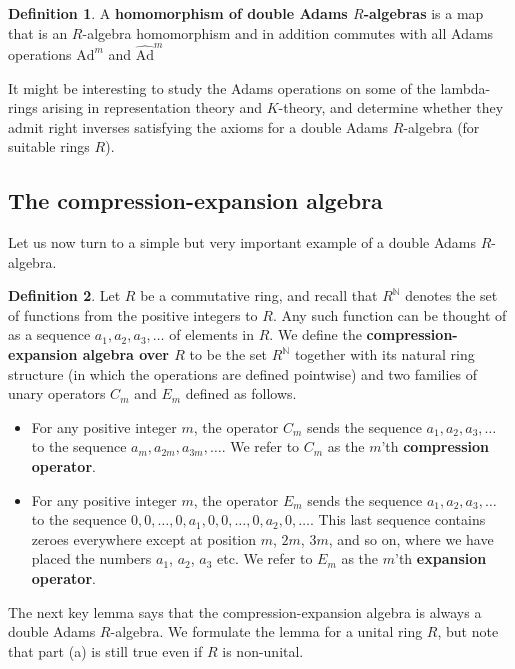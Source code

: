 \documentclass[a4paper]{article}
\theoremstyle{definition}
\newtheorem{definition}{Definition}[section]
\theoremstyle{remark}
\newcommand{\ad}[1]{\text{Ad}^{#1}}
\newcommand{\hatad}[1]{\widehat{\text{Ad}}^{#1}}
\newcommand{\N}{\mathbb{N}}
\newcommand{\defhl}[1]{\textbf{#1}}
\begin{document}
\begin{definition}
A \defhl{homomorphism of double Adams $R$-algebras} is a map that is an $R$-algebra homomorphism and in addition commutes with all Adams operations $\ad{m}$ and $\hatad{m}$
\end{definition}


It might be interesting to study the Adams operations on some of the lambda-rings arising in representation theory and $K$-theory, and determine whether they admit right inverses satisfying the axioms for a double Adams $R$-algebra (for suitable rings $R$). 

\subsection{The compression-expansion algebra}

Let us now turn to a simple but very important example of a double Adams $R$-algebra.

\begin{definition}
Let $R$ be a commutative ring, and recall that $R^{\N}$ denotes the set of functions from the positive integers to $R$. Any such function can be thought of as a sequence $a_1, a_2, a_3, \ldots$ of elements in $R$. We define the  \defhl{compression-expansion algebra over $R$} to be the set $R^{\N}$ together with its natural ring structure (in which the operations are defined pointwise) and two families of unary operators $C_m$ and $E_m$ defined as follows.
\begin{itemize}
\item For any positive integer $m$, the operator $C_m$ sends the sequence $a_1, a_2, a_3, \ldots$ to the sequence $a_{m}, a_{2m}, a_{3m}, \ldots$. We refer to $C_m$ as the $m$'th \defhl{compression operator}.
\item For any positive integer $m$, the operator $E_m$ sends the sequence $a_1, a_2, a_3, \ldots$ to the sequence $0, 0, \ldots, 0, a_1, 0, 0, \ldots, 0, a_2, 0, \ldots$. This last sequence contains zeroes everywhere except at position $m$, $2m$, $3m$, and so on, where we have placed the numbers $a_1$, $a_2$, $a_3$ etc. We refer to $E_m$ as the $m$'th \defhl{expansion operator}.
\end{itemize}
\end{definition}

The next key lemma says that the compression-expansion algebra is always a double Adams $R$-algebra. We formulate the lemma for a unital ring $R$, but note that part (a) is still true even if $R$ is non-unital. 
\end{document}
